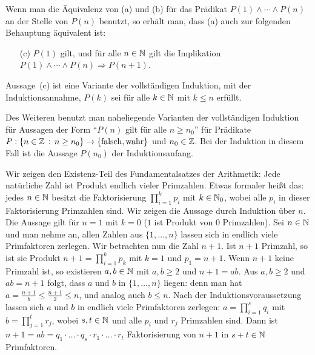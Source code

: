 Wenn man die Äquivalenz von (a) und (b) für das Prädikat $P(1) \wedge \cdots \wedge P(n)$ an der Stelle von $P(n)$ benutzt, so erhält man, dass (a) auch zur folgenden Behauptung äquivalent ist: 

\begin{itemize}
	\item[(c)] $P(1)$ gilt, und für alle $n \in \mathbb N$ gilt die Implikation $P(1) \wedge \cdots \wedge P(n) \Rightarrow P(n+1)$. 
\end{itemize} 

Aussage~(c) ist eine Variante der vollständigen Induktion, mit der Induktionsannahme, $P(k)$ sei für alle $k \in \mathbb N$ mit $k \le n$ erfüllt. 

Des Weiteren benutzt man naheliegende Varianten der vollständigen Induktion für Aussagen der Form ``$P(n)$ gilt für alle $n \ge n_0$'' für Prädikate $P : \{ n \in \mathbb Z \,:\, n \ge n_0\} \to \{ \operatorname{falsch}, \operatorname{wahr} \}$ und $n_0 \in \mathbb Z$. Bei der Induktion in diesem Fall ist die Aussage $P(n_0)$ der Induktionsanfang. 

\begin{bsp}
	Wir zeigen den Existenz-Teil des Fundamentalsatzes der Arithmetik: Jede natürliche Zahl ist Produkt endlich vieler Primzahlen.  Etwas formaler heißt das: jedes $n \in \mathbb N$ besitzt die Faktorisierung $\prod_{i=1}^k p_i$ mit $k \in \mathbb N_0$, wobei alle $p_i$ in dieser Faktorisierung Primzahlen sind. Wir zeigen die Aussage durch Induktion über $n$. Die Aussage gilt für $n=1$ mit $k=0$ ($1$ ist Produkt von $0$ Primzahlen). Sei $n \in \mathbb N$ und man nehme an, allen Zahlen aus $\{1,\ldots,n\}$ lassen sich in endlich viele Primfaktoren zerlegen. Wir betrachten nun die Zahl $n+1$. Ist $n+1$ Primzahl, so ist sie Produkt $n+ 1 = \prod_{i=1}^k p_k$ mit $k=1$ und $p_1=n+1$. Wenn $n+1$ keine Primzahl ist, so existieren $a, b \in \mathbb N$ mit $a, b \ge 2$ und $n+1 = ab$. Aus $a,b \ge 2$ und $ab = n+1$ folgt, dass $a$ und $b$ in $\{1,\ldots,n\}$ liegen: denn man hat $a = \frac{n+1}{b} \le \frac{n+1}{2} \le n$, und analog auch $b \le n$. Nach der Induktionsvoraussetzung lassen sich $a$ und $b$ in endlich viele Primfaktoren zerlegen: $a = \prod_{i=1}^s q_i$ mit $b = \prod_{j=1}^t r_j$, wobei $s, t\in \mathbb N$ und alle $p_i$ und $r_j$ Primzahlen sind. Dann ist $n+1 = ab = q_1 \cdot \ldots \cdot q_s \cdot r_1 \cdot \ldots \cdot r_t$ Faktorisierung von $n+1$ in $s+t \in \mathbb N$ Primfaktoren. 
\end{bsp} 



